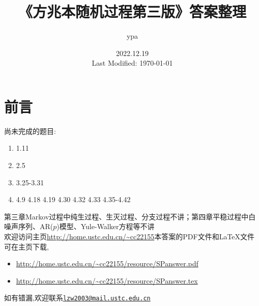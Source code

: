 \documentclass{article}
\title{《方兆本随机过程第三版》答案整理}
\author{ypa}
\date{2022.12.19\\ Last Modified: \today}
\begin{document}
\maketitle

\setcounter{section}{-1}
\section{前言}
\noindent{}尚未完成的题目:
\begin{enumerate}[label=(\chinese*)]\vspace{-1em}
  \item 1.11\vspace{-1em}
  \item 2.5\vspace{-1em}
  \item 3.25-3.31\vspace{-1em}
  \item 4.9 4.18 4.19 4.30 4.32 4.33 4.35-4.42\vspace{-1em}
\end{enumerate}
第三章Markov过程中纯生过程、生灭过程、分支过程不讲；第四章平稳过程中白噪声序列、AR($p$)模型、Yule-Walker方程等不讲\\
欢迎访问主页\url{http://home.ustc.edu.cn/~cc22155}\quad 本答案的PDF文件和LaTeX文件可在主页下载,\vspace{-1em}
\begin{itemize}
  \item \url{http://home.ustc.edu.cn/~cc22155/resource/SPanswer.pdf}\vspace{-1em}
	\item \url{http://home.ustc.edu.cn/~cc22155/resource/SPanswer.tex}
\end{itemize}\vspace{-1em}
如有错漏,欢迎联系\href{mailto:lzw2003@mail.ustc.edu.cn}{\texttt{lzw2003@mail.ustc.edu.cn}}

\tableofcontents

\clearpage
\end{document}

